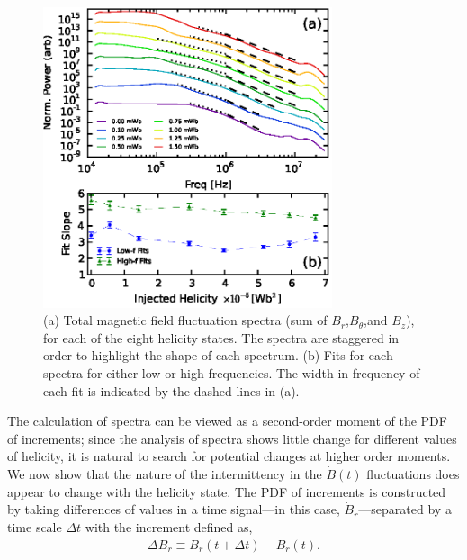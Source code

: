 \documentclass[aps,prl,amsmath,amssymb,reprint,superscriptaddress]{revtex4-1} %
\begin{document}
\begin{figure}[!htbp]
\centerline{
\includegraphics[width=8.5cm]{figure2.eps}}
\caption{\label{fig:Btot_spectra} (a) Total magnetic field fluctuation spectra (sum of $B_r$,$B_{\theta}$,and $B_{z}$), for each of the eight helicity states. The spectra are staggered in order to highlight the shape of each spectrum. (b) Fits for each spectra for either low or high frequencies. The width in frequency of each fit is indicated by the dashed lines in (a).}
\end{figure}

The calculation of spectra can be viewed as a second-order moment of the PDF of increments; since the analysis of spectra shows little change for different values of helicity, it is natural to search for potential changes at higher order moments. We now show that the nature of the intermittency in the $\dot{B}(t)$ fluctuations does appear to change with the helicity state. The PDF of increments is constructed by taking differences of values in a time signal---in this case, $\dot{B}_{r}$---separated by a time scale $\Delta t$ with the increment defined as,
\begin{equation}
\Delta \dot{B}_r \equiv \dot{B}_r(t + \Delta t)- \dot{B}_r(t).
\label{eq:increment}
\end{equation}
\end{document}
